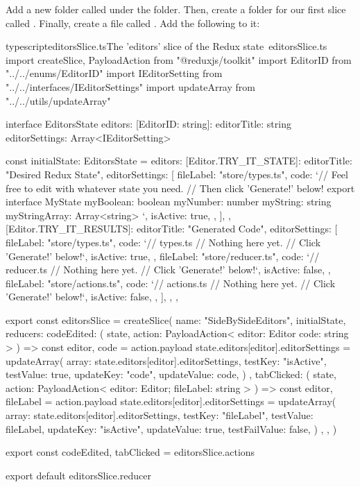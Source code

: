 \documentclass[a4paper,headinclude=on,footinclude=on,12pt,oneside]{scrbook}
\begin{document}

Add a new folder called  under the  folder. Then, create a folder for our first slice called . Finally, create a file called . Add the following to it:

\begin{codeInput}{typescript}{editorsSlice.ts}{The 'editors' slice of the Redux state\, editorsSlice.ts}
import { createSlice, PayloadAction } from "@reduxjs/toolkit"
import EditorID from "../../enums/EditorID"
import IEditorSetting from "../../interfaces/IEditorSettings"
import { updateArray } from "../../utils/updateArray"

interface EditorsState {
  editors: {
    [EditorID: string]: {
      editorTitle: string
      editorSettings: Array<IEditorSetting>
    }
  }
}

const initialState: EditorsState = {
  editors: {
    [Editor.TRY_IT_STATE]: {
      editorTitle: "Desired Redux State",
      editorSettings: [
        {
          fileLabel: "store/types.ts",
          code: `// Feel free to edit with whatever state you need.
// Then click 'Generate!' below!
export interface MyState {
  myBoolean: boolean
  myNumber: number
  myString: string
  myStringArray: Array<string>
}`,
          isActive: true,
        },
      ],
    },
    [Editor.TRY_IT_RESULTS]: {
      editorTitle: "Generated Code",
      editorSettings: [
        {
          fileLabel: "store/types.ts",
          code: `// types.ts
// Nothing here yet.
// Click 'Generate!' below!`,
          isActive: true,
        },
        {
          fileLabel: "store/reducer.ts",
          code: `// reducer.ts
// Nothing here yet.
// Click 'Generate!' below!`,
          isActive: false,
        },
        {
          fileLabel: "store/actions.ts",
          code: `// actions.ts
// Nothing here yet.
// Click 'Generate!' below!`,
          isActive: false,
        },
      ],
    },
  },
}

export const editorsSlice = createSlice({
  name: "SideBySideEditors",
  initialState,
  reducers: {
    codeEdited: (
      state,
      action: PayloadAction<{
        editor: Editor
        code: string
      }>
    ) => {
      const { editor, code } = action.payload
      state.editors[editor].editorSettings = updateArray({
        array: state.editors[editor].editorSettings,
        testKey: "isActive",
        testValue: true,
        updateKey: "code",
        updateValue: code,
      })
    },
    tabClicked: (
      state,
      action: PayloadAction<{ editor: Editor; fileLabel: string }>
    ) => {
      const { editor, fileLabel } = action.payload
      state.editors[editor].editorSettings = updateArray({
        array: state.editors[editor].editorSettings,
        testKey: "fileLabel",
        testValue: fileLabel,
        updateKey: "isActive",
        updateValue: true,
        testFailValue: false,
      })
    },
  },
})

export const { codeEdited, tabClicked } = editorsSlice.actions

export default editorsSlice.reducer
\end{codeInput}
\end{document}
